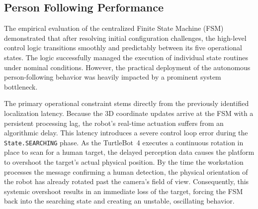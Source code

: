 \subsection{Person Following Performance}
The empirical evaluation of the centralized Finite State Machine (FSM) demonstrated that after resolving initial configuration challenges, the high-level control logic transitions smoothly and predictably between its five operational states. The logic successfully managed the execution of individual state routines under nominal conditions. However, the practical deployment of the autonomous person-following behavior was heavily impacted by a prominent system bottleneck.

The primary operational constraint stems directly from the previously identified localization latency. Because the 3D coordinate updates arrive at the FSM with a persistent processing lag, the robot's real-time actuation suffers from an algorithmic delay. This latency introduces a severe control loop error during the \texttt{State.SEARCHING} phase. As the TurtleBot~4 executes a continuous rotation in place to scan for a human target, the delayed perception data causes the platform to overshoot the target's actual physical position. By the time the workstation processes the message confirming a human detection, the physical orientation of the robot has already rotated past the camera's field of view. Consequently, this systemic overshoot results in an immediate loss of the target, forcing the FSM back into the searching state and creating an unstable, oscillating behavior.



